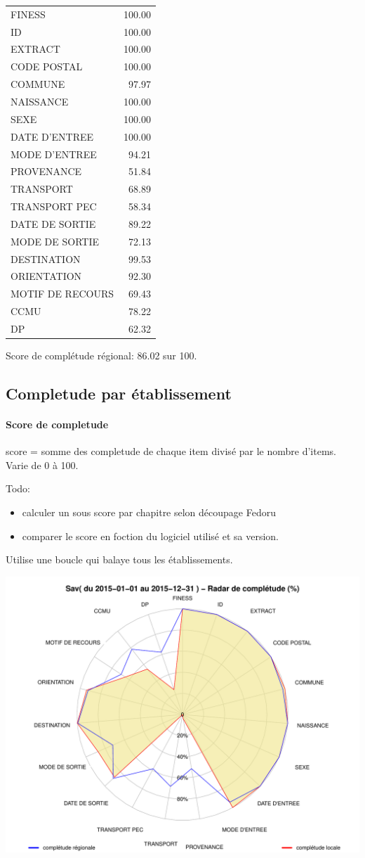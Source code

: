 \documentclass[]{article}
\begin{document}
\begin{longtable}[c]{@{}lr@{}}
\toprule
FINESS & 100.00\tabularnewline
ID & 100.00\tabularnewline
EXTRACT & 100.00\tabularnewline
CODE POSTAL & 100.00\tabularnewline
COMMUNE & 97.97\tabularnewline
NAISSANCE & 100.00\tabularnewline
SEXE & 100.00\tabularnewline
DATE D'ENTREE & 100.00\tabularnewline
MODE D'ENTREE & 94.21\tabularnewline
PROVENANCE & 51.84\tabularnewline
TRANSPORT & 68.89\tabularnewline
TRANSPORT PEC & 58.34\tabularnewline
DATE DE SORTIE & 89.22\tabularnewline
MODE DE SORTIE & 72.13\tabularnewline
DESTINATION & 99.53\tabularnewline
ORIENTATION & 92.30\tabularnewline
MOTIF DE RECOURS & 69.43\tabularnewline
CCMU & 78.22\tabularnewline
DP & 62.32\tabularnewline
\bottomrule
\end{longtable}

Score de complétude régional: 86.02 sur 100.

\subsection{Completude par
établissement}\label{completude-par-etablissement}

\paragraph{Score de completude}\label{score-de-completude}

score = somme des completude de chaque item divisé par le nombre
d'items. Varie de 0 à 100.

Todo:

\begin{itemize}
\itemsep1pt\parskip0pt
\item
  calculer un sous score par chapitre selon découpage Fedoru
\item
  comparer le score en foction du logiciel utilisé et sa version.
\end{itemize}

Utilise une boucle qui balaye tous les établissements.

\includegraphics{completude_files/figure-latex/finess-1.pdf}
\end{document}

